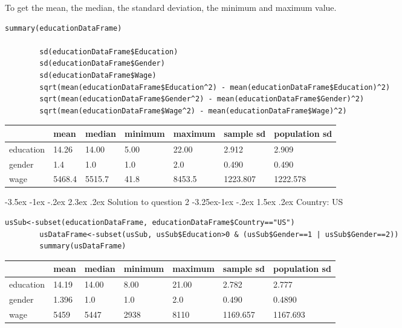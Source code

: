 \documentclass[12pt]{article}
\makeatletter
\renewcommand\section{\@startsection {section}{1}{\z@}%
	{-3.5ex \@plus -1ex \@minus -.2ex}%
	{2.3ex \@plus.2ex}%
	{\normalfont\large\bfseries}}%
\renewcommand\subsection{\@startsection{subsection}{2}{\z@}%
	{-3.25ex\@plus -1ex \@minus -.2ex}%
	{1.5ex \@plus .2ex}%
	{\normalfont\large\bfseries}}%
\makeatother
\begin{document}
	To get the mean, the median, the standard deviation, the minimum and maximum value.
	\begin{lstlisting}[breaklines=true]
		summary(educationDataFrame)
		
		sd(educationDataFrame$Education)
		sd(educationDataFrame$Gender)
		sd(educationDataFrame$Wage)
		sqrt(mean(educationDataFrame$Education^2) - mean(educationDataFrame$Education)^2)
		sqrt(mean(educationDataFrame$Gender^2) - mean(educationDataFrame$Gender)^2)
		sqrt(mean(educationDataFrame$Wage^2) - mean(educationDataFrame$Wage)^2)
	\end{lstlisting}
	\begin{table}[htbp]
		\centering
		\label{my-label}
		\begin{tabular}{l|l|l|l|l|l|l}
			\hline
			          & mean   & median & minimum & maximum & sample sd & population sd \\
			\hline
			education & 14.26  & 14.00  & 5.00    & 22.00   & 2.912     & 2.909\\
			\hline
			gender    & 1.4    & 1.0    & 1.0     & 2.0     & 0.490     & 0.490\\
			\hline
			wage      & 5468.4 & 5515.7 & 41.8    & 8453.5  & 1223.807  & 1222.578\\
			\hline
		\end{tabular}
	\end{table}
	
	\section{Solution to question 2}
	\subsection{Country: US}
	\begin{lstlisting}[breaklines=true]
		usSub<-subset(educationDataFrame, educationDataFrame$Country=="US")
		usDataFrame<-subset(usSub, usSub$Education>0 & (usSub$Gender==1 | usSub$Gender==2))
		summary(usDataFrame)
	\end{lstlisting}
		\begin{table}[htbp]
		\centering
		\label{my-label}
		\begin{tabular}{l|l|l|l|l|l|l}
			\hline
			          & mean   & median & minimum & maximum & sample sd & population sd \\
			\hline
			education & 14.19  & 14.00   & 8.00    & 21.00   & 2.782     & 2.777\\
			\hline
			gender    & 1.396  & 1.0    & 1.0     & 2.0     & 0.490     & 0.4890\\
			\hline
			wage      & 5459   & 5447   & 2938    & 8110    & 1169.657  & 1167.693\\
			\hline
		\end{tabular}
	\end{table}
\end{document}
